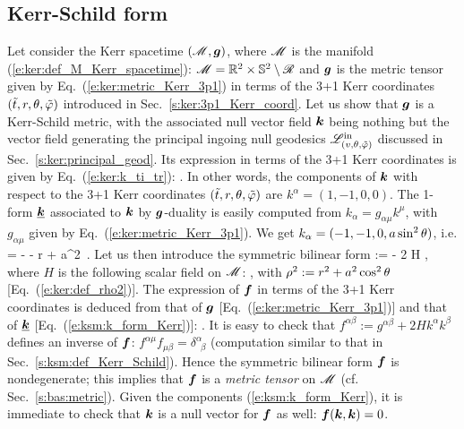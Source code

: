 \subsection{Kerr-Schild form}

Let consider the Kerr spacetime $(\mathscr{M},\bm{g})$, where $\mathscr{M}$ is the manifold
(\ref{e:ker:def_M_Kerr_spacetime}): $\mathscr{M} = \mathbb{R}^2\times\mathbb{S}^2 \setminus \mathscr{R}$
and $\bm{g}$ is the metric tensor given by Eq.~(\ref{e:ker:metric_Kerr_3p1})
in terms of the 3+1 Kerr coordinates $({\tilde t}, r, \theta,{\tilde\varphi})$ introduced in
Sec.~\ref{s:ker:3p1_Kerr_coord}.
Let us show that $\bm{g}$ is a Kerr-Schild metric, with the associated null vector
field $\bm{k}$ being nothing but the vector field generating the principal
ingoing null geodesics $\mathscr{L}^{\rm in}_{(v,\theta,{\tilde\varphi})}$  discussed in Sec.~\ref{s:ker:principal_geod}.
Its expression in terms of the 3+1 Kerr coordinates is given by Eq.~(\ref{e:ker:k_ti_tr}):
\be \label{e:ksm:k_Kerr}
    .
\ee
In other words, the components of $\bm{k}$ with respect to the 3+1 Kerr coordinates $({\tilde t}, r, \theta,{\tilde\varphi})$ are $k^\alpha = (1, -1, 0, 0)$.
The 1-form $\underline{\bm{k}}$ associated to $\bm{k}$ by $\bm{g}$-duality is easily computed
from $k_\alpha = g_{\alpha\mu} k^\mu$, with $g_{\alpha\mu}$ given by
Eq.~(\ref{e:ker:metric_Kerr_3p1}). We get
$k_\alpha = (-1, -1, 0, a\sin^2\theta)$, i.e.
\be \label{e:ksm:k_form_Kerr}
     = - \dd \ti - \dd r + a\sin^2\th \, \dd\tph .
\ee
Let us then introduce the symmetric bilinear form
\be
     :=  - 2 H  \otimes {} ,
\ee
where $H$ is the following scalar field on $\mathscr{M}$:
\be \label{e:ksm:H_Kerr}
   ,
\ee
with $\rho^2 := r^2 + a^2 \cos^2\theta$ [Eq.~(\ref{e:ker:def_rho2})].
The expression of $\bm{f}$ in terms of the 3+1 Kerr coordinates is deduced
from that of $\bm{g}$ [Eq.~(\ref{e:ker:metric_Kerr_3p1})] and that of
$\underline{\bm{k}}$ [Eq.~(\ref{e:ksm:k_form_Kerr})]:
\be \label{e:ksm:f_Kerr}
  .
\ee
It is easy to check that $f^{\alpha\beta} := g^{\alpha\beta} + 2 H k^\alpha k^\beta$
defines an inverse of $\bm{f}$: $f^{\alpha\mu} f_{\mu\beta} = \delta^\alpha_{\ \; \beta}$
(computation similar to that in Sec.~\ref{s:ksm:def_Kerr_Schild}). Hence the
symmetric bilinear form $\bm{f}$ is nondegenerate; this implies that $\bm{f}$
is a \emph{metric tensor} on $\mathscr{M}$ (cf. Sec.~\ref{s:bas:metric}).
Given the components (\ref{e:ksm:k_form_Kerr}), it is immediate to check that $\bm{k}$ is a null vector for $\bm{f}$ as well: $\bm{f}(\bm{k}, \bm{k}) = 0$.
